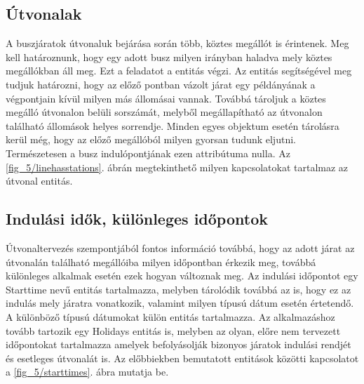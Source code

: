 \subsection*{Útvonalak}
\label{linehasstationsdetails}
A buszjáratok útvonaluk bejárása során több, köztes megállót is érintenek. 
Meg kell határoznunk, hogy egy adott busz milyen irányban haladva mely köztes megállókban áll meg. 
Ezt a feladatot a  entitás végzi. 
Az entitás segítségével meg tudjuk határozni, hogy az előző pontban vázolt járat egy példányának a végpontjain kívül milyen más állomásai vannak. 
Továbbá tároljuk a köztes megálló útvonalon belüli sorszámát, melyből megállapítható az útvonalon található állomások helyes sorrendje. 
Minden egyes objektum esetén tárolásra kerül még, hogy az előző megállóból milyen gyorsan tudunk eljutni. 
Természetesen a busz indulópontjának ezen attribútuma nulla. 
Az \ref{fig_5/linehasstations}. ábrán megtekinthető milyen kapcsolatokat tartalmaz az útvonal entitás. 
\subsection*{Indulási idők, különleges időpontok}
\label{starttimes}
Útvonaltervezés szempontjából fontos információ továbbá, hogy az adott járat az útvonalán található megállóiba milyen időpontban érkezik meg, továbbá különleges alkalmak esetén ezek hogyan változnak meg. 
Az indulási időpontot egy Starttime nevű entitás tartalmazza, melyben tárolódik továbbá az is, hogy ez az indulás mely járatra vonatkozik, valamint milyen típusú dátum esetén értetendő. 
A különböző típusú dátumokat külön entitás tartalmazza. 
Az alkalmazáshoz tovább tartozik egy Holidays entitás is, melyben az olyan, előre nem tervezett időpontokat tartalmazza amelyek befolyásolják bizonyos járatok indulási rendjét és esetleges útvonalát is. 
Az előbbiekben bemutatott entitások közötti kapcsolatot a \ref{fig_5/starttimes}. ábra mutatja be. 

